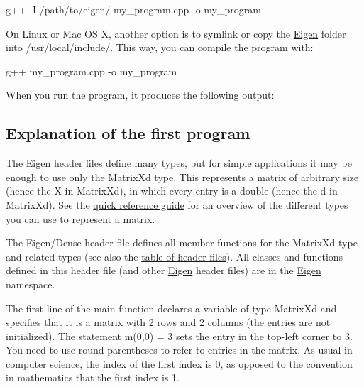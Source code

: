 \begin{DoxyCode}
g++ -I /path/to/eigen/ my\_program.cpp -o my\_program 
\end{DoxyCode}


On Linux or Mac OS X, another option is to symlink or copy the \hyperlink{namespace_eigen}{Eigen} folder into /usr/local/include/. This way, you can compile the program with\+:


\begin{DoxyCode}
g++ my\_program.cpp -o my\_program 
\end{DoxyCode}


When you run the program, it produces the following output\+:


\begin{DoxyCodeInclude}
\end{DoxyCodeInclude}
\hypertarget{_getting_started_GettingStartedExplanation}{}\subsection{Explanation of the first program}\label{_getting_started_GettingStartedExplanation}
The \hyperlink{namespace_eigen}{Eigen} header files define many types, but for simple applications it may be enough to use only the {\ttfamily Matrix\+Xd} type. This represents a matrix of arbitrary size (hence the {\ttfamily X} in {\ttfamily Matrix\+Xd}), in which every entry is a {\ttfamily double} (hence the {\ttfamily d} in {\ttfamily Matrix\+Xd}). See the \hyperlink{QuickReference.dox_QuickRef_Types}{quick reference guide} for an overview of the different types you can use to represent a matrix.

The {\ttfamily Eigen/\+Dense} header file defines all member functions for the Matrix\+Xd type and related types (see also the \hyperlink{QuickReference.dox_QuickRef_Headers}{table of header files}). All classes and functions defined in this header file (and other \hyperlink{namespace_eigen}{Eigen} header files) are in the {\ttfamily \hyperlink{namespace_eigen}{Eigen}} namespace.

The first line of the {\ttfamily main} function declares a variable of type {\ttfamily Matrix\+Xd} and specifies that it is a matrix with 2 rows and 2 columns (the entries are not initialized). The statement {\ttfamily m(0,0) = 3} sets the entry in the top-\/left corner to 3. You need to use round parentheses to refer to entries in the matrix. As usual in computer science, the index of the first index is 0, as opposed to the convention in mathematics that the first index is 1.


